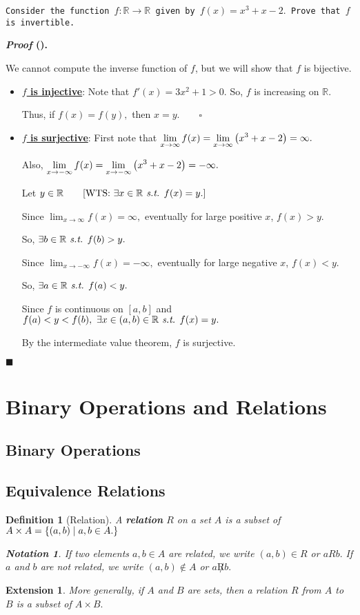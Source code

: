 \documentclass[12pt,a4paper]{article}
\newtheorem{nota}{Notation}[section]
\newtheorem{df}{Definition}[subsection]
\newcounter{nprf}[subsection]
\newenvironment*{prf}{\par\indent\textbf{\textit{Proof} (\stepcounter{nprf}\thenprf). }\par }{\par\hfill $\blacksquare$\par}
\newtheorem*{ext}{\indent Extension}
\def\R{{\mathbb{R}}}
\def\st{\emph{ s.t. }}
\begin{document}
\begin{framed}
\noindent\texttt{Consider the function $f:\R\to\R$ given by $f(x)=x^3+x-2.$ Prove that $f$ is invertible.}
\begin{prf}
	We cannot compute the inverse function of $f$, but we will show that $f$ is bijective.
	\begin{itemize}
		\item \underline{\textbf{$f$ is injective}}: Note that $f'(x)=3x^2+1>0.$ So, $f$ is increasing on $\R.$\par Thus, if $f(x)=f(y),$ then $x=y.\qquad\square$
		\item \underline{\textbf{$f$ is surjective}}: First note that $\displaystyle\lim_{x\to\infty}f(x)=\lim_{x\to\infty}\qty(x^3+x-2)=\infty.$\par Also, $\displaystyle\lim_{x\to-\infty}f(x)=\lim_{x\to-\infty}\qty(x^3+x-2)=-\infty.$\par Let $y\in\R\qquad[\text{WTS: }\exists x\in\R\st f(x)=y.]$\par Since $\displaystyle\lim_{x\to\infty}f(x)=\infty,$ eventually for large positive $x$, $f(x)>y.$\par So, $\exists b\in\R\st f(b)>y. $\par Since $\displaystyle\lim_{x\to-\infty}f(x)=-\infty,$ eventually for large negative $x$, $f(x)<y.$\par So, $\exists a\in\R\st f(a)<y.$\par Since $f$ is continuous on $[a,b]$ and $f(a)<y<f(b),\ \exists x\in(a,b)\in\R\st f(x)=y.$ \par By the intermediate value theorem, $f$ is surjective. 
	\end{itemize}
\end{prf}
\end{framed}


\newpage
\section{Binary Operations and Relations}
\subsection{Binary Operations}
\subsection{Equivalence Relations}
\begin{df}[Relation]
	A \textbf{relation} $R$	 on a set $A$ is a subset of $A\times A=\qty{\qty(a,b)\mid a,b\in A.}$ 
\begin{nota}
	If two elements $a,b\in A$ are related, we write $(a,b)\in R$ or $aRb.$ If $a$ and $b$ are not related, we write $(a,b)\notin A$ or $a\not Rb.$
\end{nota}
\end{df}
\begin{ext} More generally, if $A$ and $B$ are sets, then a relation $R$ from $A$ to $B$ is a subset of $A\times B.$\end{ext}
\end{document}
